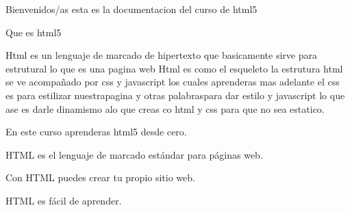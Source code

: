 Bienvenidos/as esta es la documentacion del curso de html5

    Que es html5

    Html es un lenguaje de marcado de hipertexto que basicamente sirve para estrutural lo que es una pagina web
    Html es como el esqueleto la estrutura  html se ve acompañado por css y javascript los cuales aprenderas mas adelante el css es para estilizar nuestrapagina y otras palabraspara dar estilo y javascript lo que ase es darle dinamismo alo que creas co html y css para que no sea estatico.

    En este  curso aprenderas html5 desde cero.

    HTML es el lenguaje de marcado estándar para páginas web.

     Con HTML puedes crear tu propio sitio web.

     HTML es fácil de aprender. 



